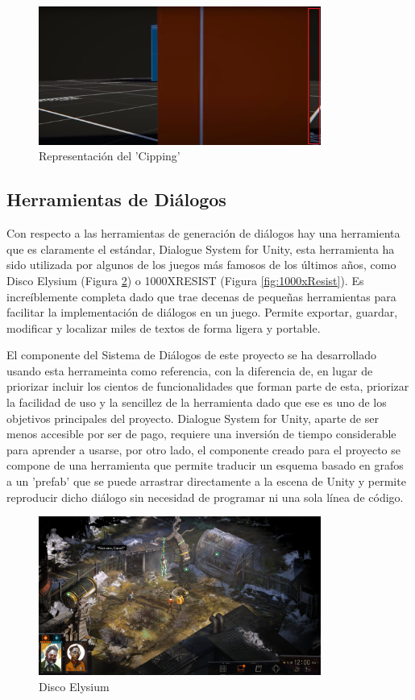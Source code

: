 \begin{figure}[H]
    \centering
    \includegraphics[width=350px,clip=true]{clipping.png}
    \caption{Representación del 'Cipping'}
    \label{fig:clipping}
\end{figure}

\subsection{Herramientas de Diálogos}
Con respecto a las herramientas de generación de diálogos hay una herramienta que es claramente el estándar, Dialogue System for Unity\cite{DialogueSystemUnity}, esta herramienta ha sido utilizada por algunos de los 
juegos más famosos de los últimos años, como Disco Elysium\cite{DiscoElysium} (Figura \ref{fig:discoelysium}) o 1000XRESIST\cite{1000xResist} (Figura \ref{fig:1000xResist}). Es increíblemente completa dado que trae 
decenas de pequeñas herramientas para facilitar la implementación de diálogos en un juego. Permite exportar, guardar, modificar y localizar miles de textos de forma ligera y portable. 

El componente del Sistema de Diálogos de este proyecto se ha desarrollado usando esta herrameinta como referencia, con la diferencia de, en lugar de priorizar incluir los cientos de funcionalidades que forman parte de esta, priorizar la 
 facilidad de uso y la sencillez de la herramienta dado que ese es uno de los objetivos principales del proyecto. Dialogue System for Unity, aparte de ser menos accesible por ser de pago, requiere una inversión de 
 tiempo considerable para aprender a usarse, por otro lado, el componente creado para el proyecto se compone de una herramienta que permite traducir un esquema basado en grafos a un 'prefab' que se puede arrastrar 
 directamente a la escena de Unity y permite reproducir dicho diálogo sin necesidad de programar ni una sola línea de código.

\begin{figure}[H]
    \centering
    \includegraphics[width=350px,clip=true]{disco_elysium.png}
    \caption{Disco Elysium}
    \label{fig:discoelysium}
\end{figure}


